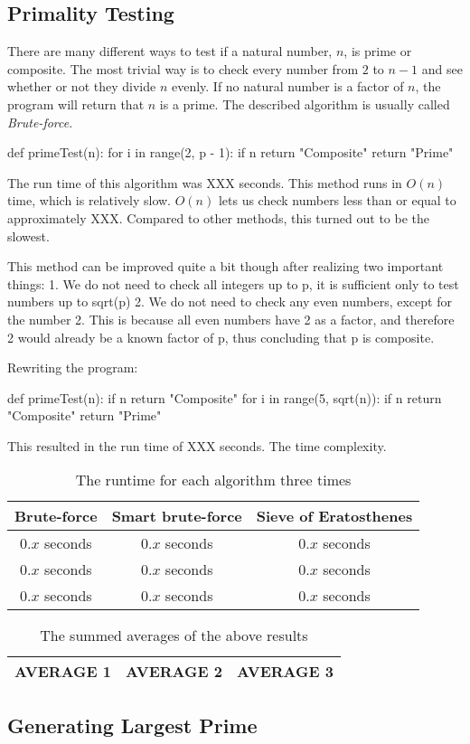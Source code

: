 \documentclass[main.tex]{subfiles}
\begin{document}
\subsection{Primality Testing}
There are many different ways to test if a natural number, $n$, is prime or composite. The most trivial way is to check every number from $2$ to $n - 1$ and see whether or not they divide $n$ evenly. If no natural number is a factor of $n$, the program will return that $n$ is a prime. The described algorithm is usually called \textit{Brute-force}. 

\begin{python}
def primeTest(n):
    for i in range(2, p - 1):
        if n %
            return "Composite"
    return "Prime"
\end{python}

The run time of this algorithm was XXX seconds. This method runs in $O(n)$ time, which is relatively slow.  $O(n)$ lets us check numbers less than or equal to approximately XXX. Compared to other methods, this turned out to be the slowest.

This method can be improved quite a bit though after realizing two important things:
1. We do not need to check all integers up to p, it is sufficient only to test numbers up to sqrt(p)
2. We do not need to check any even numbers, except for the number 2. This is because all even numbers have 2 as a factor, and therefore 2 would already be a known factor of p, thus concluding that p is composite.

Rewriting the program:

\begin{python}
def primeTest(n):
    if n %
        return "Composite"
    for i in range(5, sqrt(n)):
        if n %
            return "Composite"
    return "Prime"
\end{python}

This resulted in the run time of XXX seconds. The time complexity. 

\begin{table}[ht!]
    \centering
    \begin{tabular}{||c c c||} 
        \hline
        Brute-force & Smart brute-force & Sieve of Eratosthenes \\ [0.5ex] 
        \hline\hline
        $0.x$ seconds  & $0.x$ seconds & $0.x$ seconds  \\ 
        $0.x$ seconds & $0.x$ seconds & $0.x$ seconds  \\
        $0.x$ seconds & $0.x$ seconds & $0.x$ seconds  \\ [1ex] 
        \hline
    \end{tabular}
    \caption{The runtime for each algorithm three times}
\end{table}

\begin{table}[ht!]
    \centering
    \begin{tabular}{||c c c||} 
        \hline
        AVERAGE 1 & AVERAGE 2 & AVERAGE 3  \\ [0.5ex] 
        \hline
    \end{tabular}
    \caption{The summed averages of the above results}
\end{table}
    
   
   

\subsection{Generating Largest Prime}
\end{document}
